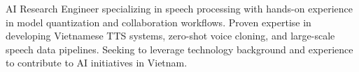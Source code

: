 

\begin{cvparagraph}

AI Research Engineer specializing in speech processing with hands-on experience in model quantization and collaboration workflows. Proven expertise in developing Vietnamese TTS systems, zero-shot voice cloning, and large-scale speech data pipelines. Seeking to leverage technology background and experience to contribute to AI initiatives in Vietnam.

\end{cvparagraph}
